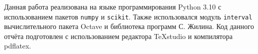 Данная работа реализована на языке программирования Python 3.10 с использованием пакетов \texttt{numpy} и \texttt{scikit}. Также использовался модуль \texttt{interval} вычислительного пакета Octave и библиотека программ С. Жилина. Код данного отчёта подготовлен с использованием редактора TeXstudio и компилятора pdflatex.
